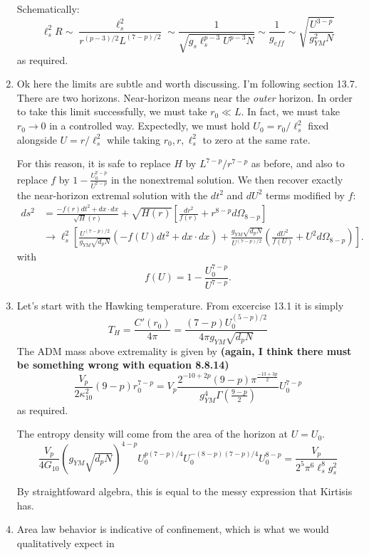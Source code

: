 \documentclass[11pt, class=article, crop=false]{standalone}
\begin{document}
\begin{enumerate}
	Schematically:
	\[
		\ell_s^2 R \sim \frac{\ell_s^2}{r^{(p-3)/2} L^{(7-p)/2}} \sim \frac{1}{\sqrt{g_s \ell_s^{p-3} U^{p-3} N} } \sim \frac{1}{g_{eff}} \sim \sqrt{\frac{U^{3-p}}{g_{YM}^2 N}}
	\]
	as required. 
	
	\item Ok here the limits are subtle and worth discussing. I'm following section 13.7. There are two horizons. Near-horizon means near the \emph{outer} horizon. In order to take this limit successfully, we must take $r_0 \ll L$. In fact, we must take $r_0 \to 0$ in a controlled way. Expectedly, we must hold $U_0 = r_0 / \ell_s^2$ fixed alongside $U = r/\ell_s^2$ while taking $r_0, r, \ell_s^2$ to zero at the same rate. 
	
	For this reason, it is safe to replace $H$ by $L^{7-p}/r^{7-p}$ as before, and also to replace $f$ by $1 - \frac{U_0^{7-p}}{U^{7-p}}$ in the nonextremal solution. We then recover exactly the near-horizon extremal solution with the $dt^2$ and $dU^2$ terms modified by $f$:
	\[
	\begin{aligned}
		ds^2 &= \frac{-f(r)  dt^2 + dx \cdot dx}{\sqrt H(r)} + \sqrt{H(r)} \left[ \frac{dr^2}{f(r)} + r^{8-p} d\Omega_{8-p}\right]\\
		& \to \ell_s^2 \left[ \frac{U^{(7-p)/2}}{g_{YM} \sqrt{d_p N}} (-f(U) dt^2 + dx \cdot dx ) + \frac{g_{YM} \sqrt{d_p N}}{U^{(7-p)/2}} \left(\frac{dU^2}{f(U)} + U^2 d\Omega_{8-p} \right) \right].
	\end{aligned}
	\]
	with 
	\[
		f(U) = 1 - \frac{U_0^{7-p}}{U^{7-p}}.
	\]
	
	\item Let's start with the Hawking temperature. From excercise 13.1 it is simply 
	\[
		T_H = \frac{C'(r_0)}{4\pi} = \frac{(7-p) U_0^{(5-p)/2}}{4 \pi g_{YM} \sqrt{d_p N}}
	\]
	The ADM mass above extremality is given by \textbf{(again, I think there must be something wrong with equation 8.8.14)}
	\[
		\frac{V_p}{2 \kappa_{10}^2}  (9-p) r_0^{7-p} = V_p \frac{2^{-10 + 2p} (9-p) \pi^{\frac{-13 + 3p}{2}}}{g_{YM}^4 \Gamma(\frac{9-p}{2})} U_0^{7-p}
	\]
	as required.
	
	The entropy density will come from the area of the horizon at $U = U_0$.
	\[
		\frac{V_p}{4 G_{10}} (g_{YM} \sqrt{d_p N})^{4-p} U_0^{p (7-p)/4} U_{0}^{-(8-p)(7-p)/4} U_0^{8-p} = \frac{V_p}{2^5 \pi^6 \ell_s^8 g_s^2}
	\]
	
	
	By straightfoward algebra, this is equal to the messy expression that Kirtisis has.  
		
	\item Area law behavior is indicative of confinement, which is what we would qualitatively expect in 
	
\end{enumerate}
\end{document}
